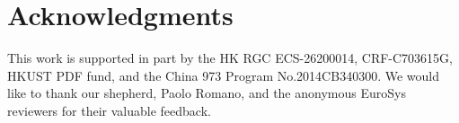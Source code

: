 \section*{Acknowledgments}
This work is supported in part by the HK RGC ECS-26200014, CRF-C703615G, HKUST PDF fund, and the China 973 Program No.2014CB340300. We would like to thank our shepherd, Paolo Romano, and the anonymous EuroSys reviewers for their valuable feedback.